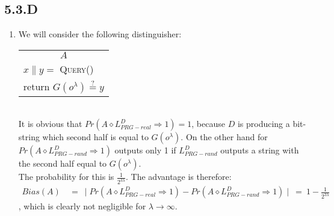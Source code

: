 \documentclass{report}
\begin{document}
	\subsection*{5.3.D}
		\begin{enumerate}[]
			\item We will consider the following distinguisher: \hspace{2cm}
			\begin{tabular}{|l|}
				\hline \multicolumn{1}{|c|}{\cellcolor[gray]{0.8} $A$} \\
				$x \| y =$ \textsc{Query()} \\
				return $G(o^{\lambda}) \stackrel{?}{=} y$ \\ \hline
			\end{tabular} \\
			It is obvious that $Pr(A \diamond L^D_{PRG-real} \Rightarrow 1) = 1$, because $D$ is producing a bit-string which second half is equal to $G(o^{\lambda})$. On the other hand for $Pr(A \diamond L^D_{PRG-rand} \Rightarrow 1)$ outputs only 1 if $L^D_{PRG-rand}$ outputs a string with the second half equal to $G(o^{\lambda})$. \\
			The probability for this is $\frac{1}{2^{3\lambda}}$. The advantage is therefore:
			\begin{align*}
				Bias(A) \ & = \ \mid Pr(A \diamond L^D_{PRG-real} \Rightarrow 1) - Pr(A \diamond L^D_{PRG-rand} \Rightarrow 1) \mid \ = \ 1 - \frac{1}{2^{3\lambda}}
			\end{align*}
			, which is clearly not negligible for $\lambda \rightarrow \infty$.
		\end{enumerate}
\end{document}
